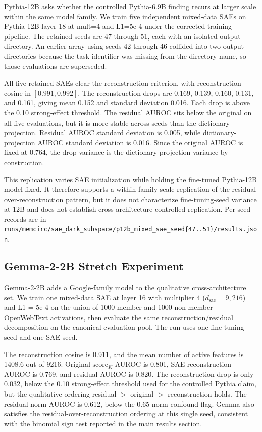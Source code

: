 Pythia-12B asks whether the controlled Pythia-6.9B finding recurs at larger scale within the same model family. We train five independent mixed-data SAEs on Pythia-12B layer 18 at mult=4 and L1=5e-4 under the corrected training pipeline. The retained seeds are 47 through 51, each with an isolated output directory. An earlier array using seeds 42 through 46 collided into two output directories because the task identifier was missing from the directory name, so those evaluations are superseded.

All five retained SAEs clear the reconstruction criterion, with reconstruction cosine in $[0.991, 0.992]$. The reconstruction drops are 0.169, 0.139, 0.160, 0.131, and 0.161, giving mean 0.152 and standard deviation 0.016. Each drop is above the 0.10 strong-effect threshold. The residual AUROC sits below the original on all five evaluations, but it is more stable across seeds than the dictionary projection. Residual AUROC standard deviation is 0.005, while dictionary-projection AUROC standard deviation is 0.016. Since the original AUROC is fixed at 0.764, the drop variance is the dictionary-projection variance by construction.

This replication varies SAE initialization while holding the fine-tuned Pythia-12B model fixed. It therefore supports a within-family scale replication of the residual-over-reconstruction pattern, but it does not characterize fine-tuning-seed variance at 12B and does not establish cross-architecture controlled replication. Per-seed records are in \texttt{runs/\allowbreak{}memcirc/\allowbreak{}sae\_\allowbreak{}dark\_\allowbreak{}subspace/\allowbreak{}p12b\_\allowbreak{}mixed\_\allowbreak{}sae\_\allowbreak{}seed\{47..51\}/\allowbreak{}results.json}.

\subsection{Gemma-2-2B Stretch Experiment}
\label{app:gemma_stretch}

Gemma-2-2B adds a Google-family model to the qualitative cross-architecture set. We train one mixed-data SAE at layer 16 with multiplier 4 ($d_{\text{sae}} = 9{,}216$) and L1 = 5e-4 on the union of 1000 member and 1000 non-member OpenWebText activations, then evaluate the same reconstruction/residual decomposition on the canonical evaluation pool. The run uses one fine-tuning seed and one SAE seed.

The reconstruction cosine is 0.911, and the mean number of active features is 1408.6 out of 9216. Original $\mathrm{score}_K$ AUROC is 0.801, SAE-reconstruction AUROC is 0.769, and residual AUROC is 0.820. The reconstruction drop is only 0.032, below the 0.10 strong-effect threshold used for the controlled Pythia claim, but the qualitative ordering residual $>$ original $>$ reconstruction holds. The residual norm AUROC is 0.612, below the 0.65 norm-confound flag. Gemma also satisfies the residual-over-reconstruction ordering at this single seed, consistent with the binomial sign test reported in the main results section.

